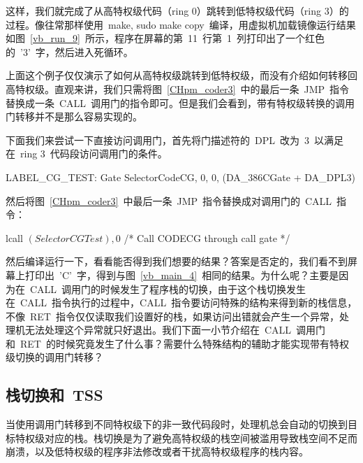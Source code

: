这样，我们就完成了从高特权级代码（ring 0）跳转到低特权级代码（ring 3）的过程。像往常那样使用~make, sudo make copy~编译，用虚拟机加载镜像运行结果如图~\ref{vb_run_9}~所示，程序在屏幕的第~11~行第~1~列打印出了一个红色的~'3'~字，然后进入死循环。


上面这个例子仅仅演示了如何从高特权级跳转到低特权级，而没有介绍如何转移回高特权级。直观来讲，我们只需将图~\ref{CHpm_coder3}~中的最后一条~JMP~指令替换成一条~CALL~调用门的指令即可。但是我们会看到，带有特权级转换的调用门转移并不是那么容易实现的。

下面我们来尝试一下直接访问调用门，首先将门描述符的~DPL~改为~3~以满足在~ring 3~代码段访问调用门的条件。

\begin{Command}
LABEL_CG_TEST:      Gate    SelectorCodeCG, 0, 0, (DA_386CGate + DA_DPL3)
\end{Command}

然后将图~\ref{CHpm_coder3}~中最后一条~JMP~指令替换成对调用门的~CALL~指令：

\begin{Command}
lcall   $(SelectorCGTest), $0  /* Call CODECG through call gate */
\end{Command}

然后编译运行一下，看看能否得到我们想要的结果？答案是否定的，我们看不到屏幕上打印出~'C'~字，得到与图~\ref{vb_main_4}~相同的结果。为什么呢？主要是因为在~CALL~调用门的时候发生了程序栈的切换，由于这个栈切换发生在~CALL~指令执行的过程中，CALL~指令要访问特殊的结构来得到新的栈信息，不像~RET~指令仅仅读取我们设置好的栈，如果访问出错就会产生一个异常，处理机无法处理这个异常就只好退出。我们下面一小节介绍在~CALL~调用门和~RET~的时候究竟发生了什么事？需要什么特殊结构的辅助才能实现带有特权级切换的调用门转移？

\subsection{栈切换和~TSS}

当使用调用门转移到不同特权级下的非一致代码段时，处理机总会自动的切换到目标特权级对应的栈。栈切换是为了避免高特权级的栈空间被滥用导致栈空间不足而崩溃，以及低特权级的程序非法修改或者干扰高特权级程序的栈内容。